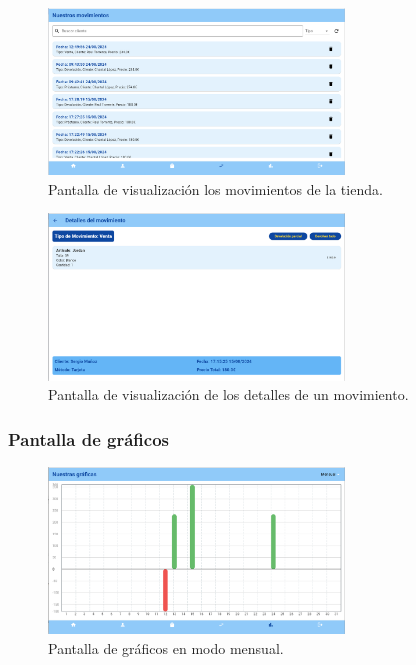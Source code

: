\begin{figure}[H]
	\centering
	\includegraphics[width=0.7\textwidth]{imagenes/TerceraIteracion/movementsView.png}
	\caption{Pantalla de visualización los movimientos de la tienda.}
\end{figure}

\begin{figure}[H]
	\centering
	\includegraphics[width=0.7\textwidth]{imagenes/TerceraIteracion/movementDetails.png}
	\caption{Pantalla de visualización de los detalles de un movimiento.}
\end{figure}

\subsubsection{Pantalla de gráficos}

\begin{figure}[H]
	\centering
	\includegraphics[width=0.7\textwidth]{imagenes/TerceraIteracion/graficosMensual.png}
	\caption{Pantalla de gráficos en modo mensual.}
\end{figure}

